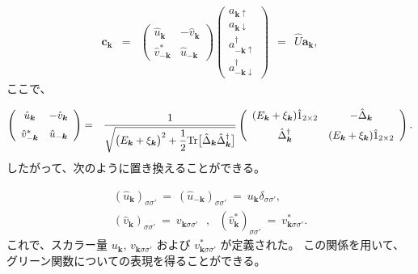 \documentclass[uplatex,a4j,12pt,dvipdfmx]{jsarticle}
\begin{document}
\begin{eqnarray}
	\bm{c}_{\bm{k}}
	&=&
	\left(
	\begin{array}{cc}
			\hat{u}_{\bm{k}}       & - \hat{v}_{\bm{k}} \\[3mm]
			\hat{v}_{- \bm{k}}^{*} & \hat{u}_{- \bm{k}}
		\end{array}
	\right)
	\!\!\!
	\left(
	\begin{array}{c}
			a_{\bm{k} \uparrow}            \\[2mm]
			a_{\bm{k} \downarrow}          \\[2mm]
			a^{\dagger}_{-\bm{k} \uparrow} \\[2mm]
			a^{\dagger}_{-\bm{k} \downarrow}
		\end{array}
	\right)
	\ \ = \ \
	\hat{U}
	\bm{a}_{\bm{k}}
	,
\end{eqnarray}
%
ここで、

\begin{eqnarray}
	\left(
	\begin{array}{cc}
			\hat{u}_{\bm{k}}       & - \hat{v}_{\bm{k}} \\[2mm]
			\hat{v}_{- \bm{k}}^{*} & \hat{u}_{-\bm{k}}
		\end{array}
	\right)
	&=&
	\dfrac{ 1 }{ \sqrt{ \big( E_{\bm{k}} + \xi_{\bm{k}} \big)^{2} + \dfrac{1}{2} {\rm Tr} \big[ \hat{\Delta}_{\bm{k}} \hat{\Delta}^{\dagger}_{\bm{k}} \big] } }
	\left(
	\begin{array}{cc}
			( E_{\bm{k}} + \xi_{\bm{k}} ) \hat{1}_{2 \times 2} & - \hat{\Delta}_{\bm{k}}                             \\[2mm]
			\hat{\Delta}_{\bm{k}}^{\dagger}                     & ( E_{\bm{k}} + \xi_{\bm{k}} ) \hat{1}_{2 \times 2}
		\end{array}
	\right)
	.
\end{eqnarray}
%
したがって、次のように置き換えることができる。

\begin{eqnarray}
	( \hat{u}_{\bm{k}} )_{\sigma \sigma'}
	\ = \
	( \hat{u}_{- \bm{k}} )_{\sigma \sigma'}
	\ = \
	u_{\bm{k}} \delta_{\sigma \sigma'}
	,
	\\[2mm]
	( \hat{v}_{\bm{k}} )_{\sigma \sigma'}
	\ = \
	v_{\bm{k} \sigma \sigma'}
	\ \ \ , \ \ \
	( \hat{v}_{\bm{k}}^{*} )_{\sigma \sigma'}
	\ = \
	v_{\bm{k} \sigma \sigma'}^{*}
	.
\end{eqnarray}
%
これで、スカラー量 $u_{\bm{k}}$, $v_{\bm{k} \sigma \sigma'}$ および $v_{\bm{k} \sigma \sigma'}^{*}$ が定義された。
この関係を用いて、グリーン関数についての表現を得ることができる。
\end{document}
